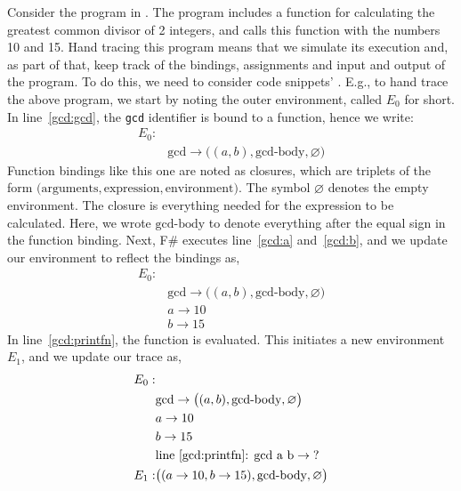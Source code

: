 Consider the program in . 
%
%
The program includes a function for calculating the greatest common divisor of 2 integers, and calls this function with the numbers 10 and 15. Hand tracing this program means that we simulate its execution and, as part of that, keep track of the bindings, assignments and input and output of the program. To do this, we need to consider code snippets' . E.g., to hand trace the above program, we start by noting the outer environment, called $E_0$ for short. In line~\ref{gcd:gcd}, the \lstinline!gcd! identifier is bound to a function, hence we write:
\begin{align*}
  E_0:&\\
  & \text{gcd} \rightarrow \big((a, b), \text{gcd-body}, \varnothing\big)
\end{align*}
Function bindings like this one are noted as closures, which are triplets of the form $\big(\text{arguments}, \text{expression}, \text{environment}\big)$. The symbol $\varnothing$ denotes the empty environment. The closure is everything needed for the expression to be calculated. Here, we wrote $\text{gcd-body}$ to denote everything after the equal sign in the function binding. Next, F\# executes line~\ref{gcd:a} and~\ref{gcd:b}, and we update our environment to reflect the bindings as, 
\begin{align*}
  E_0:&\\
  & \text{gcd} \rightarrow \big((a, b), \text{gcd-body}, \varnothing\big)\\
  & a \rightarrow 10\\
  & b \rightarrow 15
\end{align*}
In line~\ref{gcd:printfn}, the function is evaluated. This initiates a new environment $E_1$, and we update our trace as,
\begin{align*}
  E_0:&\\
      & \text{gcd} \rightarrow \big((a, b), \text{gcd-body}, \varnothing\big)\\
      & a \rightarrow 10\\
      & b \rightarrow 15\\
      & \text{line~\ref{gcd:printfn}: gcd a b} \rightarrow \text{?}\\
  E_1:& \big((a \rightarrow 10, b \rightarrow 15), \text{gcd-body}, \varnothing\big)\\
\end{align*}
